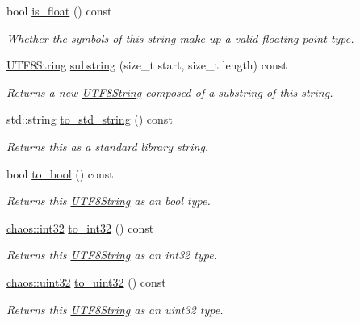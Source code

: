 \begin{DoxyCompactItemize}
bool \hyperlink{classchaos_1_1uni_1_1_u_t_f8_string_abc0b60f3ca6eff7782dc0e6a363ca919}{is\-\_\-float} () const 
\begin{DoxyCompactList}\small\item\em Whether the symbols of this string make up a valid floating point type. \end{DoxyCompactList}\item 
\hyperlink{classchaos_1_1uni_1_1_u_t_f8_string}{U\-T\-F8\-String} \hyperlink{classchaos_1_1uni_1_1_u_t_f8_string_abfc2bac44a9be97d0d27e7b245a7df6e}{substring} (size\-\_\-t start, size\-\_\-t length) const 
\begin{DoxyCompactList}\small\item\em Returns a new \hyperlink{classchaos_1_1uni_1_1_u_t_f8_string}{U\-T\-F8\-String} composed of a substring of this string. \end{DoxyCompactList}\item 
std\-::string \hyperlink{classchaos_1_1uni_1_1_u_t_f8_string_adbb12ac0c1ae8e1cb84b55cd8300fa55}{to\-\_\-std\-\_\-string} () const 
\begin{DoxyCompactList}\small\item\em Returns this as a standard library string. \end{DoxyCompactList}\item 
bool \hyperlink{classchaos_1_1uni_1_1_u_t_f8_string_a5c49dc0272b3eae0bb585b5f6ba03ad7}{to\-\_\-bool} () const 
\begin{DoxyCompactList}\small\item\em Returns this \hyperlink{classchaos_1_1uni_1_1_u_t_f8_string}{U\-T\-F8\-String} as an bool type. \end{DoxyCompactList}\item 
\hyperlink{namespacechaos_aba819cd899114dc5873e32e7b26411c4}{chaos\-::int32} \hyperlink{classchaos_1_1uni_1_1_u_t_f8_string_a743209e7c71e08c370267ae10b473ce0}{to\-\_\-int32} () const 
\begin{DoxyCompactList}\small\item\em Returns this \hyperlink{classchaos_1_1uni_1_1_u_t_f8_string}{U\-T\-F8\-String} as an int32 type. \end{DoxyCompactList}\item 
\hyperlink{namespacechaos_a8641b3ae4551f0b35570d4f9f4ec22d9}{chaos\-::uint32} \hyperlink{classchaos_1_1uni_1_1_u_t_f8_string_aa752c6db6c5a4f62c0c158d0bf7c0742}{to\-\_\-uint32} () const 
\begin{DoxyCompactList}\small\item\em Returns this \hyperlink{classchaos_1_1uni_1_1_u_t_f8_string}{U\-T\-F8\-String} as an uint32 type. \end{DoxyCompactList}\item 

\end{DoxyCompactItemize}
